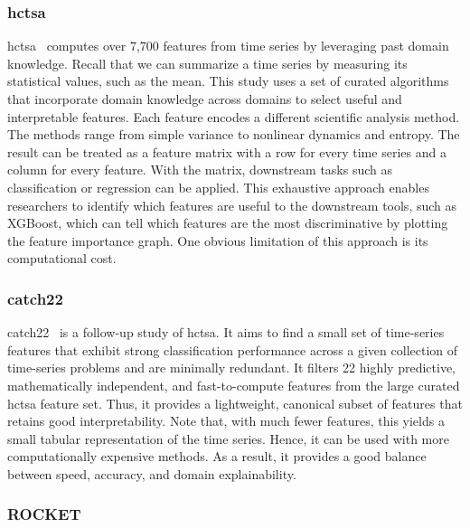 \subsubsection{hctsa} %

hctsa~\cite{fulcher2017hctsa} computes over 7,700 features from time series by leveraging past domain knowledge.
Recall that we can summarize a time series by measuring its statistical values, such as the mean.
This study uses a set of curated algorithms that incorporate domain knowledge across domains to select useful and interpretable features. 
Each feature encodes a different scientific analysis method.
The methods range from simple variance to nonlinear dynamics and entropy.
The result can be treated as a feature matrix with a row for every time series and a column for every feature.
With the matrix, downstream tasks such as classification or regression can be applied.
This exhaustive approach enables researchers to identify which features are useful to the downstream tools, such as XGBoost, which can tell which features are the most discriminative by plotting the feature importance graph.
One obvious limitation of this approach is its computational cost.

\subsubsection{catch22} %

catch22~\cite{lubba2019catch22} is a follow-up study of hctsa.
It aims to find a small set of time-series features that exhibit strong classification performance across a given collection of time-series problems and are minimally redundant.
It filters 22 highly predictive, mathematically independent, and fast-to-compute features from the large curated hctsa feature set.
Thus, it provides a lightweight, canonical subset of features that retains good interpretability.
Note that, with much fewer features, this yields a small tabular representation of the time series.
Hence, it can be used with more computationally expensive methods.
As a result, it provides a good balance between speed, accuracy, and domain explainability.

\subsubsection{ROCKET} %

